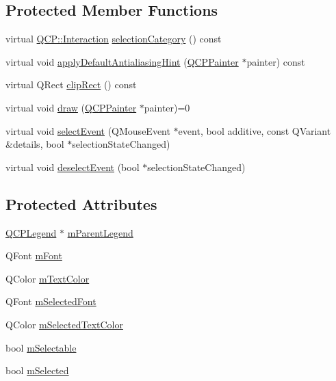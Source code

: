 \subsection*{Protected Member Functions}
\begin{DoxyCompactItemize}
\item 
virtual \hyperlink{namespaceQCP_a2ad6bb6281c7c2d593d4277b44c2b037}{Q\+C\+P\+::\+Interaction} \hyperlink{classQCPAbstractLegendItem_a53a80054ab329beaca072fb08c08944b}{selection\+Category} () const 
\item 
virtual void \hyperlink{classQCPAbstractLegendItem_a71c3baeda42ba78d2cccd97e74110a5e}{apply\+Default\+Antialiasing\+Hint} (\hyperlink{classQCPPainter}{Q\+C\+P\+Painter} $\ast$painter) const 
\item 
virtual Q\+Rect \hyperlink{classQCPAbstractLegendItem_abcb540c331b49ef7ee0ea1abbd0dcac3}{clip\+Rect} () const 
\item 
virtual void \hyperlink{classQCPAbstractLegendItem_a97dedc084c672359710f16b31d046d1d}{draw} (\hyperlink{classQCPPainter}{Q\+C\+P\+Painter} $\ast$painter)=0
\item 
virtual void \hyperlink{classQCPAbstractLegendItem_abcfe9e335d99c7fac74e03d26723c1b7}{select\+Event} (Q\+Mouse\+Event $\ast$event, bool additive, const Q\+Variant \&details, bool $\ast$selection\+State\+Changed)
\item 
virtual void \hyperlink{classQCPAbstractLegendItem_ae64e667e7c5b85cd92c9b91928faef28}{deselect\+Event} (bool $\ast$selection\+State\+Changed)
\end{DoxyCompactItemize}
\subsection*{Protected Attributes}
\begin{DoxyCompactItemize}
\item 
\hyperlink{classQCPLegend}{Q\+C\+P\+Legend} $\ast$ \hyperlink{classQCPAbstractLegendItem_aafcd9fc6fcb10f4a8d46037011afafe8}{m\+Parent\+Legend}
\item 
Q\+Font \hyperlink{classQCPAbstractLegendItem_ae916a78ac0d2a60e20a17ca2f24f9754}{m\+Font}
\item 
Q\+Color \hyperlink{classQCPAbstractLegendItem_a974b21e9930227d281344bd2242d289d}{m\+Text\+Color}
\item 
Q\+Font \hyperlink{classQCPAbstractLegendItem_ab971df604306b192875a7d097feb1e21}{m\+Selected\+Font}
\item 
Q\+Color \hyperlink{classQCPAbstractLegendItem_a4965c13854d970b24c284f0a4f005fbd}{m\+Selected\+Text\+Color}
\item 
bool \hyperlink{classQCPAbstractLegendItem_aa84029f57b1b32f642fb7db63c3fc2c2}{m\+Selectable}
\item 
bool \hyperlink{classQCPAbstractLegendItem_ae58ebebbd0c36cc6fe897483369984d2}{m\+Selected}
\end{DoxyCompactItemize}
